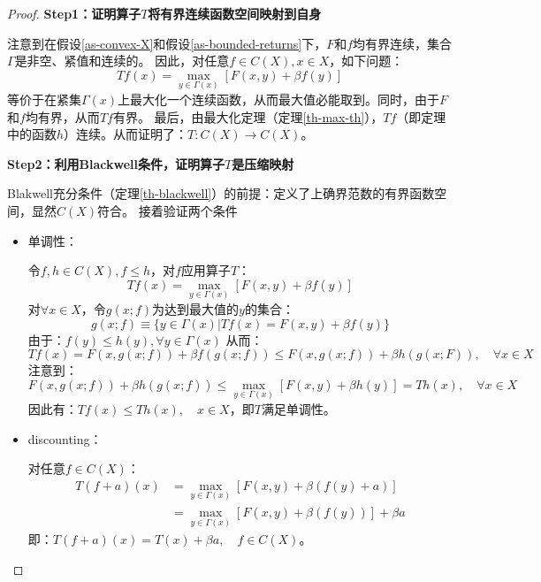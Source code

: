 \begin{proof}
    \textbf{Step1：证明算子$T$将有界连续函数空间映射到自身}

    注意到在假设\ref{as-convex-X}和假设\ref{as-bounded-returns}下，$F$和$f$均有界连续，集合$\Gamma$是非空、紧值和连续的。
    因此，对任意$f\in C\left(X\right), x\in X$，如下问题：
    $$Tf\left(x\right)=\max_{y\in\Gamma\left(x\right)}\left[F\left(x,y\right)+\beta f\left(y\right)\right]$$
    等价于在紧集$\Gamma\left(x\right)$上最大化一个连续函数，从而最大值必能取到。同时，由于$F$和$f$均有界，从而$Tf$有界。
    最后，由最大化定理（定理\ref{th-max-th}），$Tf$（即定理中的函数$h$）连续。从而证明了：$T: C\left(X\right)\rightarrow C\left(X\right)$。

    \textbf{Step2：利用Blackwell条件，证明算子$T$是压缩映射}

    Blakwell充分条件（定理\ref{th-blackwell}）的前提：定义了上确界范数的有界函数空间，显然$C\left(X\right)$符合。
    接着验证两个条件
    \begin{itemize}
        \item 单调性：
        
            令$f,h \in C\left(X\right), f\leq h$，对$f$应用算子$T$：
            $$Tf\left(x\right)=\max_{y\in \Gamma\left(x\right)}\left[F\left(x,y\right)+\beta f\left(y\right)\right]$$
            对$\forall x\in X$，令$g\left(x;f\right)$为达到最大值的$y$的集合：
            $$
            g\left(x;f\right)\equiv \{y\in\Gamma\left(x\right)|Tf\left(x\right)=F\left(x,y\right)+\beta f\left(y\right)\}
            $$
            由于：$f\left(y\right)\leq h\left(y\right), \forall y\in \Gamma\left(x\right)$
            从而：$$Tf\left(x\right)=F\left(x,g\left(x;f\right)\right)+\beta f\left(g\left(x;f\right)\right)
            \leq F\left(x,g\left(x;f\right)\right)+\beta h\left(g\left(x;F\right)\right), \quad \forall x\in X$$
            注意到：
            $$
            F(x, g(x ; f))+\beta h(g(x ; f)) \leq \max _{y \in \Gamma(x)}[F(x, y)+\beta h(y)]=T h(x), \quad \forall x \in X
            $$
            因此有：$Tf\left(x\right)\leq Th\left(x\right), \quad x\in X$，即$T$满足单调性。
        \item discounting：
        
            对任意$f\in C\left(X\right)$：
            $$
            \begin{aligned}
                T\left(f+a\right)\left(x\right) &= 
                    \max_{y\in\Gamma\left(x\right)}\left[F\left(x,y\right)+\beta \left(f\left(y\right)+a\right)\right]\\
                    &= \max_{y\in\Gamma\left(x\right)}\left[F\left(x,y\right)+\beta \left(f\left(y\right)\right)\right]+\beta a
            \end{aligned}
            $$
            即：$T\left(f+a\right)\left(x\right)=T\left(x\right)+\beta a, \quad f\in C\left(X\right)$。
    \end{itemize}


\end{proof}
